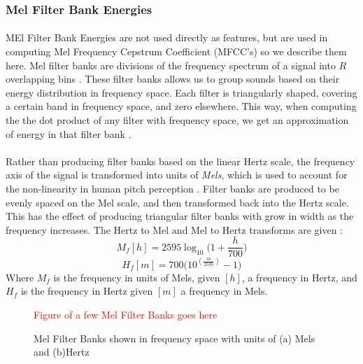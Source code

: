\documentclass[12pt,letterpaper]{article}
\begin{document}

\subsubsection{Mel Filter Bank Energies}

\paragraph*{}MEl Filter Bank Energies are not used directly as features, but are used in computing Mel Frequency Cepstrum Coefficient (MFCC's) so we describe them here. Mel filter banks are divisions of the frequency spectrum of a signal into $R$ overlapping bins \cite{Sahidullah,Serizel}. These filter banks allows us to group sounds based on their energy distribution in frequency space. Each filter is triangularly shaped, covering a certain band in frequency space, and zero elsewhere. This way, when computing the the dot product of any filter with frequency space, we get an approximation of energy in that filter bank \cite{Sahidullah,Serizel}. 

\paragraph*{}Rather than producing filter banks based on the linear Hertz scale, the frequency axis of the signal is transformed into units of \textit{Mels}, which is used to account for the non-linearity in human pitch perception \cite{Serizel,Kahn}. Filter banks are produced to be evenly spaced on the Mel scale, and then transformed back into the Hertz scale. This has the effect of producing triangular filter banks with grow in width as the frequency increases. The Hertz to Mel and Mel to Hertz transforms are given \cite{Serizel,Kahn}:
\begin{equation}
\label{eqn-HztoMel}
M_f[h] = 2595 \log_{10}\big(1+ \frac{h}{700}\big)
\end{equation}
\begin{equation}
\label{eqn-MeltoHz}
H_f[m] = 700 \big(10^{(\frac{m}{2595})}-1\big)
\end{equation}
Where $M_f$ is the frequency in units of Mels, given $[h]$, a frequency in Hertz, and $H_f$ is the frequency in Hertz given $[m]$ a frequency in Mels.


\begin{figure}[H]
\begin{center}
\textcolor{red}{Figure of a few Mel Filter Banks goes here}
\end{center}
\caption{Mel Filter Banks shown in frequency space with units of (a) Mels and (b)Hertz}
\label{fig-MelFilterBanks}
\end{figure}
\end{document}
